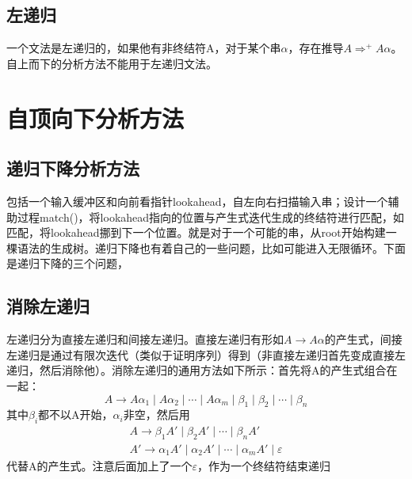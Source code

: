 \documentclass[]{report}
\begin{document}
		\subsection{左递归}
		一个文法是左递归的，如果他有非终结符A，对于某个串$\alpha$，存在推导$A\Rightarrow^+A\alpha$。自上而下的分析方法不能用于左递归文法。
	\section{自顶向下分析方法}
		\subsection{递归下降分析方法}
		包括一个输入缓冲区和向前看指针lookahead，自左向右扫描输入串；设计一个辅助过程match()，将lookahead指向的位置与产生式迭代生成的终结符进行匹配，如匹配，将lookahead挪到下一个位置。就是对于一个可能的串，从root开始构建一棵语法的生成树。递归下降也有着自己的一些问题，比如可能进入无限循环。下面是递归下降的三个问题，
		\subsection{消除左递归}
		左递归分为直接左递归和间接左递归。直接左递归有形如$A\rightarrow A\alpha$的产生式，间接左递归是通过有限次迭代（类似于证明序列）得到（非直接左递归首先变成直接左递归，然后消除他）。消除左递归的通用方法如下所示：首先将A的产生式组合在一起：
		\[A\to A\alpha_1\mid A\alpha_2\mid\cdots\mid A\alpha_m\mid\beta_1\mid\beta_2\mid\cdots\mid\beta_n\]
		其中$\beta_i$都不以A开始，$\alpha_i$非空，然后用
		\[\begin{gathered}
			A\to\beta_1A'\mid\beta_2A'\mid\cdots\mid\beta_nA'\\
			A'\to\alpha_1A'\mid\alpha_2A'\mid\cdots\mid\alpha_mA'\mid\varepsilon
		\end{gathered}\]
		代替A的产生式。注意后面加上了一个$\varepsilon$，作为一个终结符结束递归
\end{document}
